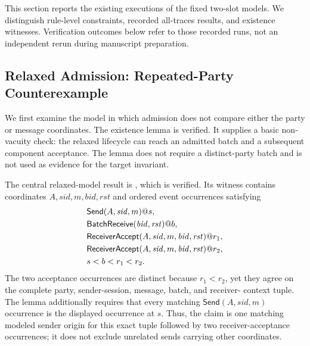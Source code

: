 
This section reports the existing executions of the fixed two-slot models.
We distinguish rule-level constraints, recorded all-traces results, and
existence witnesses. Verification outcomes below refer to those recorded
runs, not an independent rerun during manuscript preparation.

\subsection{Relaxed Admission: Repeated-Party Counterexample}

We first examine the model in which admission does not compare either the
party or message coordinates. The existence lemma
 is verified. It supplies a
basic non-vacuity check: the relaxed lifecycle can reach an admitted batch and
a subsequent component acceptance. The lemma does not require a
distinct-party batch and is not used as evidence for the target invariant.

The central relaxed-model result is
, which is verified. Its witness
contains coordinates $A,\mathit{sid},m,\mathit{bid},\mathit{rst}$ and ordered
event occurrences satisfying
\begin{equation}
  \begin{aligned}
    &\mathsf{Send}(A,\mathit{sid},m)@s, \\
    &\mathsf{BatchReceive}(\mathit{bid},\mathit{rst})@b, \\
    &\textsf{ReceiverAccept}(A,\mathit{sid},m,
       \mathit{bid},\mathit{rst})@r_1, \\
    &\textsf{ReceiverAccept}(A,\mathit{sid},m,
       \mathit{bid},\mathit{rst})@r_2, \\
    &s < b < r_1 < r_2.
  \end{aligned}
  \label{eq:relaxed-duplicate-witness}
\end{equation}
The two acceptance occurrences are distinct because $r_1<r_2$, yet they
agree on the complete party, sender-session, message, batch, and receiver-
context tuple. The lemma additionally requires that every matching
\(\mathsf{Send}(A,\mathit{sid},m)\) occurrence is the displayed occurrence
at $s$. Thus, the claim is one matching modeled sender origin for this exact
tuple followed by two receiver-acceptance occurrences; it does not exclude
unrelated sends carrying other coordinates.

